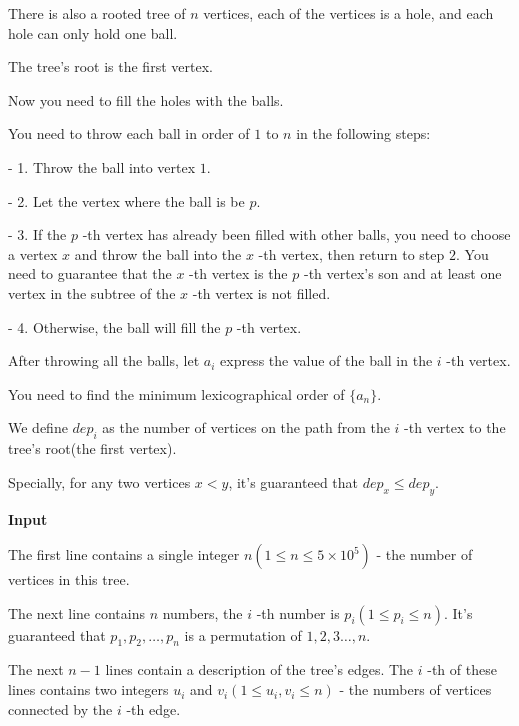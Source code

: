 \documentclass[a4paper]{article}
\begin{document}
    
    
There is also a rooted tree of $n$ vertices, each of the vertices is a hole, and each hole can only hold one ball.
    
    
    
The tree's root is the first vertex.
    
    
    
Now you need to fill the holes with the balls.
    
You need to throw each ball in order of $1$ to $n$ in the following steps:

- 1. Throw the ball into vertex $1$.

- 2. Let the vertex where the ball is be $p$.

- 3. If the $p$ -th vertex has already been filled with other balls, you need to choose a vertex $x$ and throw the ball into the $x$ -th vertex, then return to step $2$. You need to guarantee that the $x$ -th vertex is the $p$ -th vertex's son and at least one vertex in the subtree of the $x$ -th vertex is not filled.

- 4. Otherwise, the ball will fill the $p$ -th vertex.

After throwing all the balls, let $a_i$ express the value of the ball in the $i$ -th vertex.
    
    
    
You need to find the minimum lexicographical order of $\{a_n\}$.
    
    
    
We define $dep_i$ as the number of vertices on the path from the $i$ -th vertex to the tree's root(the first vertex).
    
    
    
Specially, for any two vertices $x<y$, it's guaranteed that $dep_x\le dep_y$.

\vspace{0.01\textheight}
\textbf{\textsf{Input}}
\vspace{0.01\textheight}

The first line contains a single integer $n(1\le n\le 5\times 10^5)$ - the number of vertices in this tree.
    
    
    
The next line contains $n$ numbers, the $i$ -th number is $p_i(1\le p_i\le n)$. It's guaranteed that $p_1,p_2,\dots,p_n$ is a permutation of $1,2,3\dots,n$.
    
    
    
The next $n-1$ lines contain a description of the tree's edges. The $i$ -th of these lines contains two integers $u_i$ and $v_i(1\le u_i,v_i\le n) $ - the numbers of vertices connected by the $i$ -th edge.
    
\end{document}
